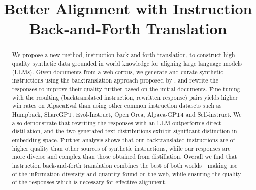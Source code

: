 \title{Better Alignment with Instruction Back-and-Forth Translation}



\maketitle
\begin{abstract}
We propose a new method, instruction back-and-forth translation, to construct high-quality synthetic data grounded in world knowledge for aligning large language models (LLMs). Given documents from a web corpus, we generate and curate synthetic instructions using the backtranslation approach proposed by \citet{li2023self}, and rewrite the responses to improve their quality further based on the initial documents. Fine-tuning with the resulting (backtranslated instruction, rewritten response) pairs yields higher win rates on AlpacaEval than using other common instruction datasets such as Humpback, ShareGPT, Evol-Instruct, Open Orca, Alpaca-GPT4 and Self-instruct. We also demonstrate that rewriting the responses with an LLM outperforms direct distillation, and the two generated text distributions exhibit significant distinction in embedding space.
Further analysis shows that our backtranslated instructions are of higher quality than other sources of synthetic instructions, while our responses are more diverse and complex than those obtained from distillation. Overall we find that instruction back-and-forth translation combines the best of both worlds---making use of the information diversity and quantity found on the web, while ensuring the quality of the responses which is necessary for effective alignment.
\end{abstract}

